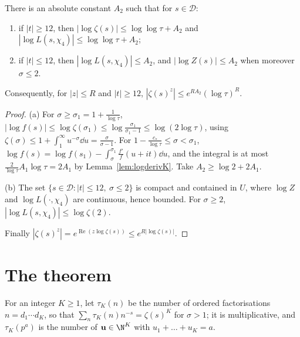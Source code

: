 \begin{lemma}\label{lem:logzeta}
There is an absolute constant $A_2$ such that for $s\in\mathcal D$:
\begin{enumerate}[label=(\alph*)]
\item if $|t|\ge12$, then $|\log\zeta(s)|\le\log\log\tau+A_2$ and $|\log L(s,\chi_4)|\le\log\log\tau+A_2$;
\item if $|t|\le12$, then $|\log L(s,\chi_4)|\le A_2$, and $|\log Z(s)|\le A_2$ when moreover $\sigma\le2$.
\end{enumerate}
Consequently, for $|z|\le R$ and $|t|\ge12$, $|\zeta(s)^z|\le e^{RA_2}(\log\tau)^R$.
\end{lemma}
\begin{proof}
(a) For $\sigma\ge\sigma_1=1+\frac1{\log\tau}$, $|\log f(s)|\le\log\zeta(\sigma_1)\le\log\frac{\sigma_1}{\sigma_1-1}\le\log(2\log\tau)$, using $\zeta(\sigma)\le1+\int_1^\infty u^{-\sigma}\dd u=\frac\sigma{\sigma-1}$. For $1-\frac{c_*}{\log\tau}\le\sigma<\sigma_1$, $\log f(s)=\log f(s_1)-\int_\sigma^{\sigma_1}\frac{f'}f(u+it)\dd u$, and the integral is at most $\frac2{\log\tau}A_1\log\tau=2A_1$ by Lemma~\ref{lem:logderivK}. Take $A_2\ge\log2+2A_1$.

(b) The set $\{s\in\mathcal D:|t|\le12,\ \sigma\le2\}$ is compact and contained in $U$, where $\log Z$ and $\log L(\cdot,\chi_4)$ are continuous, hence bounded. For $\sigma\ge2$, $|\log L(s,\chi_4)|\le\log\zeta(2)$.

Finally $|\zeta(s)^z|=e^{\operatorname{Re}(z\log\zeta(s))}\le e^{R|\log\zeta(s)|}$.
\end{proof}

\section{The theorem}

For an integer $K\ge1$, let $\tau_K(n)$ be the number of ordered factorisations $n=d_1\cdots d_K$, so that $\sum_n\tau_K(n)n^{-s}=\zeta(s)^K$ for $\sigma>1$; it is multiplicative, and $\tau_K(p^a)$ is the number of $\mathbf u\in\N^K$ with $u_1+\dots+u_K=a$.

